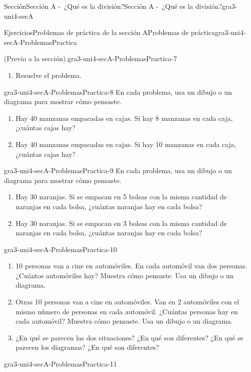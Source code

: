 \documentclass[twoside,14pt,]{extarticle}
\begin{document}
\begin{sectionptx}{Sección}{Sección A -~¿Qué es la división?}{}{Sección A -~¿Qué es la división?}{}{}{gra3-uni4-secA}
\begin{exercises-subsection}{Ejercicios}{Problemas de práctica de la sección A}{}{Problemas de práctica}{}{}{gra3-uni4-secA-ProblemasPractica}
\begin{divisionexercise}{5}{(Previo a la sección).}{}{gra3-uni4-secA-ProblemasPractica-7}
\begin{enumerate}[label=(\alph*)]
\item{}Resuelve el problema.%
\end{enumerate}
%
\end{divisionexercise}%
\begin{divisionexercise}{6}{}{}{gra3-uni4-secA-ProblemasPractica-8}%
En cada problema, usa un dibujo o un diagrama para mostrar cómo pensaste.%
\par
%
\begin{enumerate}[label=(\alph*)]
\item{}Hay 40 manzanas empacadas en cajas. Si hay 8 manzanas en cada caja, ¿cuántas cajas hay?%
\item{}Hay 40 manzanas empacadas en cajas. Si hay 10 manzanas en cada caja, ¿cuántas cajas hay?%
\end{enumerate}
%
\end{divisionexercise}%
\begin{divisionexercise}{7}{}{}{gra3-uni4-secA-ProblemasPractica-9}%
En cada problema, usa un dibujo o un diagrama para mostrar cómo pensaste.%
%
\begin{enumerate}[label=(\alph*)]
\item{}Hay 30 naranjas. Si se empacan en 5 bolsas con la misma cantidad de naranjas en cada bolsa, ¿cuántas naranjas hay en cada bolsa?%
\item{}Hay 30 naranjas. Si se empacan en 3 bolsas con la misma cantidad de naranjas en cada bolsa, ¿cuántas naranjas hay en cada bolsa?%
\end{enumerate}
\end{divisionexercise}%
\begin{divisionexercise}{8}{}{}{gra3-uni4-secA-ProblemasPractica-10}%
%
\begin{enumerate}[label=(\alph*)]
\item{}10 personas van a cine en automóviles. En cada automóvil van dos personas. ¿Cuántos automóviles hay? Muestra cómo pensaste. Usa un dibujo o un diagrama.%
\item{}Otras 10 personas van a cine en automóviles. Van en 2 automóviles con el mismo número de personas en cada automóvil. ¿Cuántas personas hay en cada automóvil? Muestra cómo pensaste. Usa un dibujo o un diagrama.%
\item{}¿En qué se parecen las dos situaciones? ¿En qué son diferentes? ¿En qué se parecen los diagramas? ¿En qué son diferentes?%
\end{enumerate}
%
\end{divisionexercise}%
\begin{divisionexercise}{9}{}{}{gra3-uni4-secA-ProblemasPractica-11}%

\end{divisionexercise}
\end{exercises-subsection}
\end{sectionptx}
\end{document}

